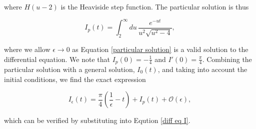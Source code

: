 \documentclass{article}
\numberwithin{equation}{section} %
\begin{document}
\noindent where $H(u-2)$ is the Heaviside step function. The particular solution is thus 

\begin{equation}
I_p(t) = \int^\infty_2 du \, \frac{e^{-ut}}{u^2\sqrt{u^2-4}},
\label{particular solution}
\end{equation}

\noindent where we allow $\epsilon\rightarrow 0$ as Equation \ref{particular solution} is a valid solution to the differential equation. We note that $I_p(0) = -\frac{1}{4}$ and $I'(0) = \frac{\pi}{4}$. Combining the particular solution with a general solution, $I_0(t)$, and taking into account the initial conditions, we find the exact expression


\begin{equation}
I_\epsilon(t) = \frac{\pi}{4}(\frac{1}{\epsilon}-t) + I_p(t) +\mathcal{O}(\epsilon),
\label{I full solution}
\end{equation}

\noindent which can be verified by substituting into Eqution \ref{diff eq I}.
\end{document}
